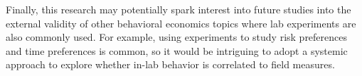 \documentclass[12pt]{article}
\begin{document}
Finally, this research may potentially spark interest into future studies into the external validity of other behavioral economics topics where lab experiments are also commonly used. For example, using experiments to study risk preferences and time preferences is common, so it would be intriguing to adopt a systemic approach to explore whether in-lab behavior is correlated to field measures.





\newpage




%

%
%
%
%
%
%
%
%
%
%
%
\end{document}
